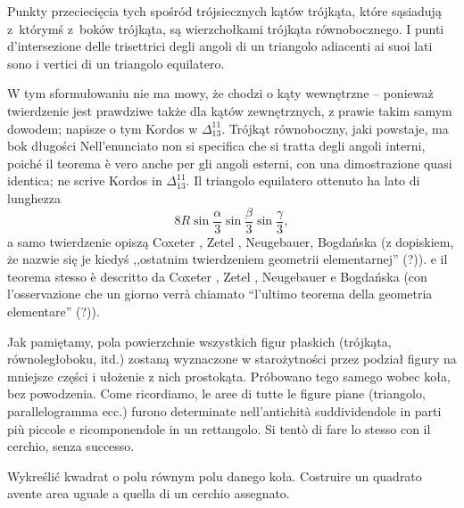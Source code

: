 \begin{theorem}[Morleya]
    Punkty przeciecięcia tych spośród trójsiecznych kątów trójkąta, które sąsiadują z~którymś z~boków trójkąta, są wierzchołkami trójkąta równobocznego. %
    I punti d'intersezione delle trisettrici degli angoli di un triangolo adiacenti ai suoi lati sono i vertici di un triangolo equilatero. %
\end{theorem}

W tym sformułowaniu nie ma mowy, że chodzi o kąty wewnętrzne -- ponieważ twierdzenie jest prawdziwe także dla kątów zewnętrznych, z prawie takim samym dowodem; napisze o tym Kordos w $\Delta_{13}^{11}$. %
Trójkąt równoboczny, jaki powstaje, ma bok długości %
Nell'enunciato non si specifica che si tratta degli angoli interni, poiché il teorema è vero anche per gli angoli esterni, con una dimostrazione quasi identica; ne scrive Kordos in $\Delta_{13}^{11}$. %
Il triangolo equilatero ottenuto ha lato di lunghezza %
\begin{equation}
    8 R \sin \frac \alpha 3 \sin \frac \beta 3 \sin \frac \gamma 3,
\end{equation}
a samo twierdzenie opiszą Coxeter \cite[s. 39-41]{coxeter_1967}, Zetel \cite[s. 177-179]{zetel_2020}, Neugebauer, Bogdańska \cite[s. 87, 105]{neugebauer_2018} (z dopiskiem, że nazwie się je kiedyś ,,ostatnim twierdzeniem geometrii elementarnej'' (?)). %
e il teorema stesso è descritto da Coxeter \cite[p. 39-41]{coxeter_1967}, Zetel \cite[p. 177-179]{zetel_2020}, Neugebauer e Bogdańska \cite[p. 87, 105]{neugebauer_2018} (con l'osservazione che un giorno verrà chiamato ``l'ultimo teorema della geometria elementare'' (?)). %

Jak pamiętamy, pola powierzchnie wszystkich figur płaskich (trójkąta, równoległoboku, itd.) zostaną wyznaczone w starożytności przez podział figury na mniejsze części i ułożenie z nich prostokąta. %
Próbowano tego samego wobec koła, bez powodzenia. %
Come ricordiamo, le aree di tutte le figure piane (triangolo, parallelogramma ecc.) furono determinate nell'antichità suddividendole in parti più piccole e ricomponendole in un rettangolo. %
Si tentò di fare lo stesso con il cerchio, senza successo. %

\begin{problem}
[kwadratura koła] %
[quadratura del cerchio] %
%
    Wykreślić kwadrat o polu równym polu danego koła. %
    Costruire un quadrato avente area uguale a quella di un cerchio assegnato. %
\end{problem}


